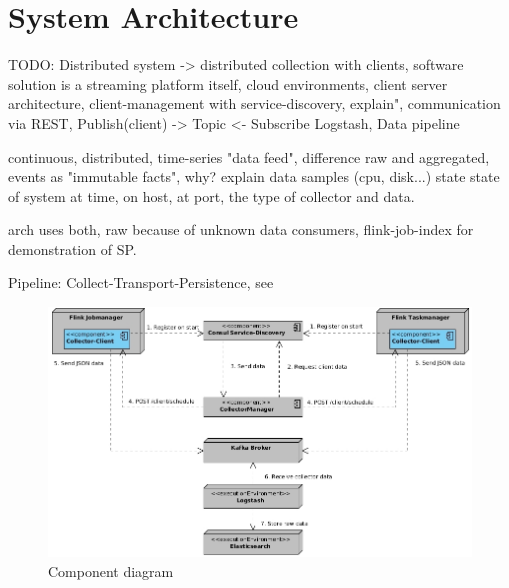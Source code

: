 \chapter{System Architecture}


%
%
%
%

TODO:
Distributed system -> distributed collection with clients, software solution is a streaming platform itself,
cloud environments, client server architecture, client-management with service-discovery, explain", communication via REST,
Publish(client) -> Topic <- Subscribe Logstash, Data pipeline

continuous, distributed, time-series "data feed", difference raw and aggregated\cite{Klepp16},
events as "immutable facts", why? explain data samples (cpu, disk...)
state state of system at time, on host, at port, the type of collector and data.

arch uses both, raw because of unknown data consumers, flink-job-index for demonstration
of SP.

Pipeline: Collect-Transport-Persistence, see \cite{VanL14}

\begin{figure}[H]
	\centering
	\includegraphics[width=1.0\textwidth]{../uml/component-diagram.jpg}
	\caption{Component diagram}
	\label{component-diagram}
\end{figure}

